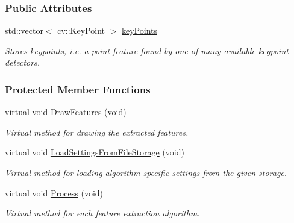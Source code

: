 \subsubsection*{Public Attributes}
\begin{DoxyCompactItemize}
\item 
std\-::vector$<$ cv\-::\-Key\-Point $>$ \hyperlink{group___feature_extractor_a72cc606c0090a64718a7e92bca7520b9}{key\-Points}
\begin{DoxyCompactList}\small\item\em Stores keypoints, i.\-e. a point feature found by one of many available keypoint detectors. \end{DoxyCompactList}\end{DoxyCompactItemize}
\subsubsection*{Protected Member Functions}
\begin{DoxyCompactItemize}
\item 
virtual void \hyperlink{group___feature_extractor_acea1ee12c177894819ea7ae0f6294e5c}{Draw\-Features} (void)
\begin{DoxyCompactList}\small\item\em Virtual method for drawing the extracted features. \end{DoxyCompactList}\item 
virtual void \hyperlink{group___feature_extractor_aa48133762d9f52a5c2ae5042f6ebbe71}{Load\-Settings\-From\-File\-Storage} (void)
\begin{DoxyCompactList}\small\item\em Virtual method for loading algorithm specific settings from the given storage. \end{DoxyCompactList}\item 
virtual void \hyperlink{group___feature_extractor_a9fdfc934c5a9da6962ec39c1b0cf32dc}{Process} (void)
\begin{DoxyCompactList}\small\item\em Virtual method for each feature extraction algorithm. \end{DoxyCompactList}\end{DoxyCompactItemize}
